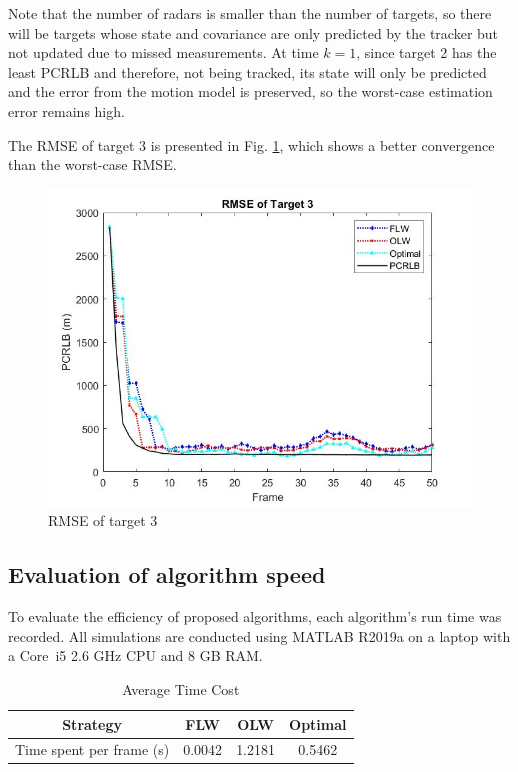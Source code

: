 \documentclass[12pt,journal,draftclsnofoot,onecolumn]{IEEEtran}
\begin{document}
Note that the number of radars is smaller than the number of targets, so there will be targets whose state and covariance are only predicted by the tracker but not updated due to missed measurements. At time $k=1$, since target 2 has the least PCRLB and therefore, not being tracked, its state will only be predicted and the error from the motion model is preserved, so the worst-case estimation error remains high.

The RMSE of target 3 is presented in Fig. \ref{fig:RMSE3}, which shows a better convergence than the worst-case RMSE.

\begin{figure}
	\centering
	\includegraphics[scale=0.36]{RMSE3.jpg}
	\caption{RMSE of target 3}
	\label{fig:RMSE3}
\end{figure}

\subsection{Evaluation of algorithm speed}
To evaluate the efficiency of proposed algorithms, each algorithm's run time was recorded. All simulations are conducted using MATLAB R2019a on a laptop with a Core\texttrademark\ i5 2.6 GHz CPU and 8 GB RAM.

 \begin{table}
	\centering
	\caption{Average Time Cost}
	\begin{tabular}{cccc}
		\toprule
		Strategy & FLW & OLW & Optimal\\ 
		\midrule
		Time spent per frame (s) & 0.0042 & 1.2181 & 0.5462\\ 
		\bottomrule
	\end{tabular}
	\label{tab:Run time}
\end{table}
\end{document}
